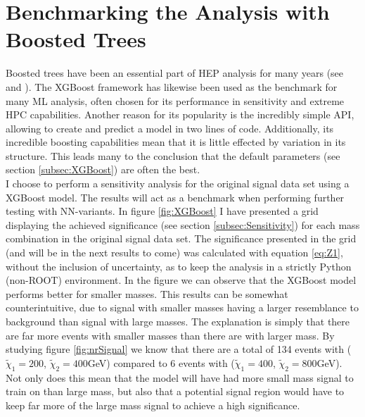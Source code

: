 \section{Benchmarking the Analysis with Boosted Trees}\label{sec:XGBoost}
Boosted trees have been an essential part of \ac{HEP} analysis for many years (see 
\cite{ATLAS-CONF-2011-152} and \cite{ATLAS-CONF-2017-064}). The XGBoost framework has likewise 
been used as the benchmark for many \ac{ML} analysis, often chosen for its performance in sensitivity and 
extreme \ac{HPC} capabilities. Another reason for its popularity is the incredibly simple \ac{API}, allowing 
to create and predict a model in two lines of code. Additionally, its incredible boosting capabilities mean 
that it is little effected by variation in its structure. This leads many to the conclusion that the default 
parameters (see section \ref{subsec:XGBoost}) are often the best. 
\\
I choose to perform a sensitivity analysis for the original signal data set using a XGBoost model. The results
will act as a benchmark when performing further testing with \ac{NN}-variants. In figure \ref{fig:XGBoost} 
I have presented a grid displaying the achieved significance (see section \ref{subsec:Sensitivity}) for each 
mass combination in the original signal data set. The significance presented in the grid (and will be in the next results to come) 
was calculated with equation \ref{eq:Z1}, without the inclusion of uncertainty, as to keep the analysis in a strictly Python (non-ROOT) 
environment. In the figure we can observe that the XGBoost model performs
better for smaller masses. This results can be somewhat counterintuitive, due to signal with smaller masses 
having a larger resemblance to background than signal with large masses. The explanation is simply that there are
far more events with smaller masses than there are with larger mass. By studying figure \ref{fig:nrSignal} we know that 
there are a total of 134 events with ($\tilde{\chi}_1=200$, $\tilde{\chi}_2=400$GeV) compared to 6 events 
with ($\tilde{\chi}_1=400$, $\tilde{\chi}_2=800$GeV). Not only does this mean that the model will have had 
more small mass signal to train on than large mass, but also that a potential signal region would have to keep 
far more of the large mass signal to achieve a high significance.
\\
